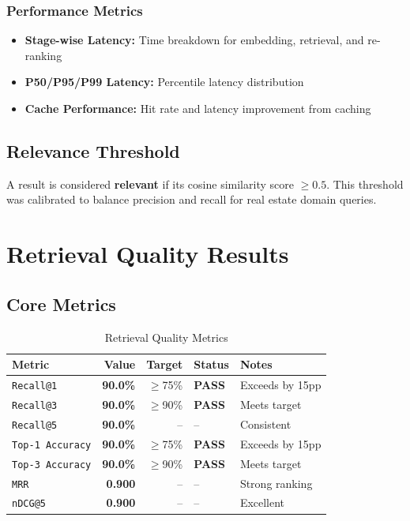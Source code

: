 \documentclass[11pt,a4paper]{article}
\newcommand{\passmark}{\textcolor{pass}{\textbf{PASS}}}
\newcommand{\metric}[1]{\texttt{#1}}
\newcommand{\metricvalue}[1]{\textbf{#1}}
\begin{document}
\subsubsection{Performance Metrics}

\begin{itemize}[leftmargin=*]
    \item \textbf{Stage-wise Latency:} Time breakdown for embedding, retrieval, and re-ranking
    \item \textbf{P50/P95/P99 Latency:} Percentile latency distribution
    \item \textbf{Cache Performance:} Hit rate and latency improvement from caching
\end{itemize}

\subsection{Relevance Threshold}

A result is considered \textbf{relevant} if its cosine similarity score $\geq 0.5$. This threshold was calibrated to balance precision and recall for real estate domain queries.

\section{Retrieval Quality Results}

\subsection{Core Metrics}

\begin{table}[H]
\centering
\begin{tabular}{lrrll}
\toprule
\textbf{Metric} & \textbf{Value} & \textbf{Target} & \textbf{Status} & \textbf{Notes} \\
\midrule
\metric{Recall@1} & \metricvalue{90.0\%} & $\geq$75\% & \passmark & Exceeds by 15pp \\
\metric{Recall@3} & \metricvalue{90.0\%} & $\geq$90\% & \passmark & Meets target \\
\metric{Recall@5} & \metricvalue{90.0\%} & -- & -- & Consistent \\
\metric{Top-1 Accuracy} & \metricvalue{90.0\%} & $\geq$75\% & \passmark & Exceeds by 15pp \\
\metric{Top-3 Accuracy} & \metricvalue{90.0\%} & $\geq$90\% & \passmark & Meets target \\
\metric{MRR} & \metricvalue{0.900} & -- & -- & Strong ranking \\
\metric{nDCG@5} & \metricvalue{0.900} & -- & -- & Excellent \\
\bottomrule
\end{tabular}
\caption{Retrieval Quality Metrics}
\end{table}
\end{document}
